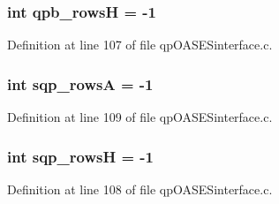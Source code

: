 \subsubsection[{qpb\_\-rowsH}]{\setlength{\rightskip}{0pt plus 5cm}int {\bf qpb\_\-rowsH} = -\/1}\label{qpOASESinterface_8c_aaf396384d57a43eeca9f4af31d92a0a0}


Definition at line 107 of file qpOASESinterface.c.

\subsubsection[{sqp\_\-rowsA}]{\setlength{\rightskip}{0pt plus 5cm}int {\bf sqp\_\-rowsA} = -\/1}\label{qpOASESinterface_8c_a1c621e63577f6fa2bbfc5facd712f8fa}


Definition at line 109 of file qpOASESinterface.c.

\subsubsection[{sqp\_\-rowsH}]{\setlength{\rightskip}{0pt plus 5cm}int {\bf sqp\_\-rowsH} = -\/1}\label{qpOASESinterface_8c_a298b6d0fa3b6bc30e9c84da972cd710d}


Definition at line 108 of file qpOASESinterface.c.

